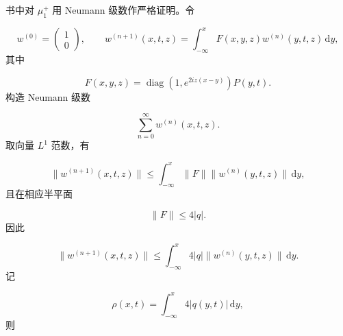 \documentclass[
    lang=cn,
    scheme=chinese,
    mode=simple,
    device=normal,
    color=blue,
    math=cm,
    thmcnt=section,
    12pt,
    nowatermark
]{elegantbook}
\begin{document}
\begin{callout}
    书中对 $\mu_1^+$ 用 Neumann 级数作严格证明。令

    \begin{equation}
        w^{(0)}=\begin{pmatrix}1\\0\end{pmatrix},
        \qquad
        w^{(n+1)}(x,t,z)
        =
        \int_{-\infty}^{x}
        F(x,y,z)w^{(n)}(y,t,z)\,\mathrm dy,
        \tag{5.2.7}
        \label{eq:5.2.7}
    \end{equation}
    其中

    \begin{equation}
        F(x,y,z)
        =
        \operatorname{diag}\!\left(1,e^{2iz(x-y)}\right)P(y,t).
        \tag{5.2.8}
        \label{eq:5.2.8}
    \end{equation}
    构造 Neumann 级数

    \begin{equation}
        \sum\limits_{n=0}^{\infty}w^{(n)}(x,t,z).
        \tag{5.2.9}
        \label{eq:5.2.9}
    \end{equation}
    取向量 $L^1$ 范数，有

    \begin{equation}
        \lVert w^{(n+1)}(x,t,z)\rVert
        \le
        \int_{-\infty}^{x}
        \lVert F\rVert
        \lVert w^{(n)}(y,t,z)\rVert\,\mathrm dy,
        \tag{5.2.10}
        \label{eq:5.2.10}
    \end{equation}
    且在相应半平面

    \begin{equation}
        \lVert F\rVert\le4\lvert q\rvert.
        \tag{5.2.11}
        \label{eq:5.2.11}
    \end{equation}
    因此

    \begin{equation}
        \lVert w^{(n+1)}(x,t,z)\rVert
        \le
        \int_{-\infty}^{x}
        4\lvert q\rvert
        \lVert w^{(n)}(y,t,z)\rVert\,\mathrm dy.
        \tag{5.2.12}
        \label{eq:5.2.12}
    \end{equation}
    记

    \begin{equation}
        \rho(x,t)
        =
        \int_{-\infty}^{x}4\lvert q(y,t)\rvert\,\mathrm dy,
        \tag{5.2.13}
        \label{eq:5.2.13}
    \end{equation}
    则


\end{callout}
\end{document}
